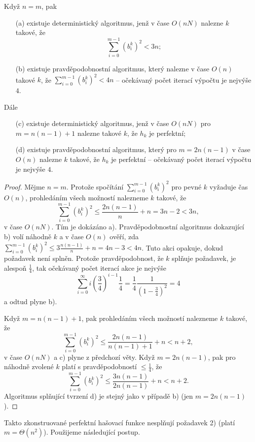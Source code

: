 \documentclass[a4paper,12pt]{article}
\begin{document}
\begin{tvrzeni}Když $n=m$, pak 
\begin{enumerate}
\item[(a)]
existuje deterministický algoritmus, jenž v čase $O(nN)$ 
nalezne $k$ takové, že 
$$\sum_{i=0}^{m-1}(b_i^k)^2<3n;$$
\item[(b)]
existuje pravděpodobnostní algoritmus, který 
nalezne v čase $O(n)$ takové $k$, že $\sum_{i=0}^{m-1}(b_
i^k)^2<4n$ -- očekávaný počet iterací výpočtu je nejvýše $
4$.
\end{enumerate}
Dále 
\begin{enumerate}
\item[(c)]
existuje deterministický algoritmus, jenž v čase $O(nN)$ pro 
$m=n(n-1)+1$ nalezne takové $k$, že $h_k$ je 
perfektní;
\item[(d)]
existuje pravděpodobnostní algoritmus, který pro 
$m=2n(n-1)$ v čase $O(n)$ nalezne $k$ takové, že $h_k$ je 
perfektní -- očekávaný počet iterací výpočtu 
je nejvýše $4$.
\end{enumerate}
\end{tvrzeni}

\begin{proof}Mějme $n=m$. Protože spočítání 
$\sum_{i=0}^{m-1}(b_i^k)^2$ pro pevné $k$ vyžaduje čas $O
(n)$, prohledáním 
všech možností nalez\-ne\-me $k$ takové, že 
$$\sum_{i=0}^{m-1}(b_i^k)^2\le\frac {2n(n-1)}n+n=3n-2<3n,$$
v čase $O(nN)$. Tím je 
dokázáno a). Pravděpodobnostní algoritmus dokazující b) volí 
náhodně $k$ a v čase $O(n)$ ověří, zda 
$\sum_{i=0}^{m-1}(b_i^k)^2\le 3\frac {n(n-1)}n+n=4n-3<4n$. Tuto akci opakuje, dokud 
požadavek není splněn. Protože pravděpodobnost, že $
k$ splňuje 
požadavek, je alespoň $\frac 14$, tak očekávaný počet ite\-rací 
akce je nejvýše 
$$\sum_{i=0}^{\infty}i(\frac 34)^{i-1}\frac 14=\frac 14\frac 1{(1
-\frac 34)^2}=4$$
a odtud plyne b). 

Když $m=n(n-1)+1$, pak prohledáním všech možností 
nalezne\-me $k$ takové, že 
$$\sum_{i=0}^{m-1}(b_i^k)^2\le\frac {2n(n-1)}{n(n-1)+1}+n<n+2,$$
 v 
čase $O(nN)$ a c) plyne z předchozí věty. Když 
$m=2n(n-1)$, pak pro náhodně zvolené $k$ platí s 
pravděpodobností $\le\frac 14$, že 
$$\sum_{i=0}^{m-1}(b_i^k)^2\le\frac {3n(n-1)}{2n(n-1)}+n<n+2.$$
Algoritmus splňující tvrzení d) je stejný jako 
v případě b) (jen $m=2n(n-1)$).
\end{proof}

Takto zkonstruované perfektní hašovací funkce 
nesplňují poža\-davek 2) (platí $m=\Theta (n^2)$).  Použijeme následující 
postup. 
\end{document}
